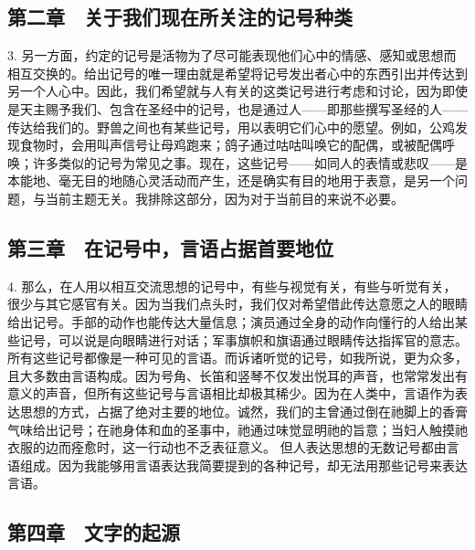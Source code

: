 
\subsection{第二章　关于我们现在所关注的记号种类}

3. 另一方面，约定的记号是活物为了尽可能表现他们心中的情感、感知或思想而相互交换的。给出记号的唯一理由就是希望将记号发出者心中的东西引出并传达到另一个人心中。因此，我们希望就与人有关的这类记号进行考虑和讨论，因为即使是天主赐予我们、包含在圣经中的记号，也是通过人——即那些撰写圣经的人——传达给我们的。野兽之间也有某些记号，用以表明它们心中的愿望。例如，公鸡发现食物时，会用叫声信号让母鸡跑来；鸽子通过咕咕叫唤它的配偶，或被配偶呼唤；许多类似的记号为常见之事。现在，这些记号——如同人的表情或悲叹——是本能地、毫无目的地随心灵活动而产生，还是确实有目的地用于表意，是另一个问题，与当前主题无关。我排除这部分，因为对于当前目的来说不必要。\par


\subsection{第三章　在记号中，言语占据首要地位}

4. 那么，在人用以相互交流思想的记号中，有些与视觉有关，有些与听觉有关，很少与其它感官有关。因为当我们点头时，我们仅对希望借此传达意愿之人的眼睛给出记号。手部的动作也能传达大量信息；演员通过全身的动作向懂行的人给出某些记号，可以说是向眼睛进行对话；军事旗帜和旗语通过眼睛传达指挥官的意志。所有这些记号都像是一种可见的言语。而诉诸听觉的记号，如我所说，更为众多，且大多数由言语构成。因为号角、长笛和竖琴不仅发出悦耳的声音，也常常发出有意义的声音，但所有这些记号与言语相比却极其稀少。因为在人类中，言语作为表达思想的方式，占据了绝对主要的地位。诚然，我们的主曾通过倒在祂脚上的香膏气味给出记号；在祂身体和血的圣事中，祂通过味觉显明祂的旨意；当妇人触摸祂衣服的边而痊愈时，这一行动也不乏表征意义。 但人表达思想的无数记号都由言语组成。因为我能够用言语表达我简要提到的各种记号，却无法用那些记号来表达言语。\par


\subsection{第四章　文字的起源}

